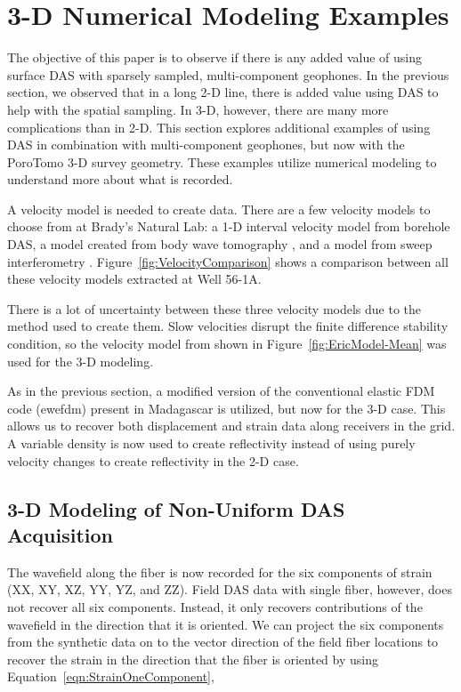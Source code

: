 \section{3-D Numerical Modeling Examples}
The objective of this paper is to observe if there is any added value of using surface DAS with sparsely sampled, multi-component geophones. In the previous section, we observed that in a long 2-D line, there is added value using DAS to help with the spatial sampling. In 3-D, however, there are many more complications than in 2-D. This section explores additional examples of using DAS in combination with multi-component geophones, but now with the PoroTomo 3-D survey geometry. These examples utilize numerical modeling to understand more about what is recorded.

A velocity model is needed to create data. There are a few velocity models to choose from at Brady's Natural Lab: a 1-D interval velocity model from borehole DAS, a model created from body wave tomography \citep{clifford017properties}, and a model from sweep interferometry \citep{matzelseismic}. Figure~\ref{fig:VelocityComparison} shows a comparison between all these velocity models extracted at Well 56-1A.


There is a lot of uncertainty between these three velocity models due to the method used to create them. Slow velocities disrupt the finite difference stability condition, so the velocity model from \citet{matzelseismic} shown in Figure~\ref{fig:EricModel-Mean} was used for the 3-D modeling.


As in the previous section, a modified version of the conventional elastic FDM code (ewefdm) present in Madagascar \citep{fomel2013madagascar} is utilized, but now for the 3-D case. This allows us to recover both displacement and strain data along receivers in the grid. A variable density is now used to create reflectivity instead of using purely velocity changes to create reflectivity in the 2-D case.

\subsection{3-D Modeling of Non-Uniform DAS Acquisition}
The wavefield along the fiber is now recorded for the six components of strain (XX, XY, XZ, YY, YZ, and ZZ). Field DAS data with single fiber, however, does not recover all six components. Instead, it only recovers contributions of the wavefield in the direction that it is oriented. We can project the six components from the synthetic data on to the vector direction of the field fiber locations to recover the strain in the direction that the fiber is oriented by using Equation~\ref{eqn:StrainOneComponent},

